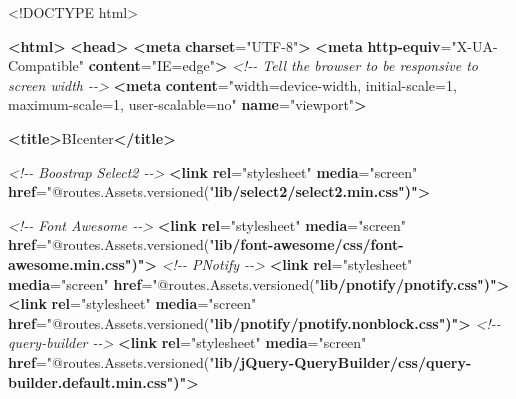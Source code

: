 \documentclass[
  11pt,
]{krantz}
\newenvironment{Shaded}{\begin{snugshade}}{\end{snugshade}}
\newcommand{\CommentTok}[1]{\textcolor[rgb]{0.37,0.37,0.37}{\textit{#1}}}
\newcommand{\DataTypeTok}[1]{\textcolor[rgb]{0.27,0.27,0.27}{#1}}
\newcommand{\ErrorTok}[1]{\textcolor[rgb]{0.14,0.14,0.14}{\textbf{#1}}}
\newcommand{\KeywordTok}[1]{\textcolor[rgb]{0.27,0.27,0.27}{\textbf{#1}}}
\newcommand{\NormalTok}[1]{#1}
\newcommand{\OtherTok}[1]{\textcolor[rgb]{0.37,0.37,0.37}{#1}}
\newcommand{\StringTok}[1]{\textcolor[rgb]{0.5,0.5,0.5}{#1}}
\begin{document}
\begin{Shaded}
\begin{Highlighting}[]
\DataTypeTok{\textless{}!DOCTYPE }\NormalTok{html}\DataTypeTok{\textgreater{}}

\KeywordTok{\textless{}html\textgreater{}}
    \KeywordTok{\textless{}head\textgreater{}}
        \KeywordTok{\textless{}meta} \ErrorTok{charset}\OtherTok{=}\StringTok{"UTF{-}8"}\KeywordTok{\textgreater{}}
    \KeywordTok{\textless{}meta} \ErrorTok{http{-}equiv}\OtherTok{=}\StringTok{"X{-}UA{-}Compatible"} \ErrorTok{content}\OtherTok{=}\StringTok{"IE=edge"}\KeywordTok{\textgreater{}}
    \CommentTok{\textless{}!{-}{-} Tell the browser to be responsive to screen width {-}{-}\textgreater{}}
    \KeywordTok{\textless{}meta} \ErrorTok{content}\OtherTok{=}\StringTok{"width=device{-}width, initial{-}scale=1, maximum{-}scale=1, user{-}scalable=no"} \ErrorTok{name}\OtherTok{=}\StringTok{"viewport"}\KeywordTok{\textgreater{}}

    \KeywordTok{\textless{}title\textgreater{}}\NormalTok{BIcenter}\KeywordTok{\textless{}/title\textgreater{}}

    \CommentTok{\textless{}!{-}{-} Boostrap Select2 {-}{-}\textgreater{}}
    \KeywordTok{\textless{}link} \ErrorTok{rel}\OtherTok{=}\StringTok{"stylesheet"} \ErrorTok{media}\OtherTok{=}\StringTok{"screen"} \ErrorTok{href}\OtherTok{=}\StringTok{"@routes.Assets.versioned("}\ErrorTok{lib/select2/select2.min.css")"}\KeywordTok{\textgreater{}}

    \CommentTok{\textless{}!{-}{-} Font Awesome {-}{-}\textgreater{}}
    \KeywordTok{\textless{}link} \ErrorTok{rel}\OtherTok{=}\StringTok{"stylesheet"} \ErrorTok{media}\OtherTok{=}\StringTok{"screen"} \ErrorTok{href}\OtherTok{=}\StringTok{"@routes.Assets.versioned("}\ErrorTok{lib/font{-}awesome/css/font{-}awesome.min.css")"}\KeywordTok{\textgreater{}}
    \CommentTok{\textless{}!{-}{-} PNotify {-}{-}\textgreater{}}
    \KeywordTok{\textless{}link} \ErrorTok{rel}\OtherTok{=}\StringTok{"stylesheet"} \ErrorTok{media}\OtherTok{=}\StringTok{"screen"} \ErrorTok{href}\OtherTok{=}\StringTok{"@routes.Assets.versioned("}\ErrorTok{lib/pnotify/pnotify.css")"}\KeywordTok{\textgreater{}}
    \KeywordTok{\textless{}link} \ErrorTok{rel}\OtherTok{=}\StringTok{"stylesheet"} \ErrorTok{media}\OtherTok{=}\StringTok{"screen"} \ErrorTok{href}\OtherTok{=}\StringTok{"@routes.Assets.versioned("}\ErrorTok{lib/pnotify/pnotify.nonblock.css")"}\KeywordTok{\textgreater{}}
    \CommentTok{\textless{}!{-}{-} query{-}builder {-}{-}\textgreater{}}
    \KeywordTok{\textless{}link} \ErrorTok{rel}\OtherTok{=}\StringTok{"stylesheet"} \ErrorTok{media}\OtherTok{=}\StringTok{"screen"} \ErrorTok{href}\OtherTok{=}\StringTok{"@routes.Assets.versioned("}\ErrorTok{lib/jQuery{-}QueryBuilder/css/query{-}builder.default.min.css")"}\KeywordTok{\textgreater{}}


\end{Highlighting}
\end{Shaded}
\end{document}
